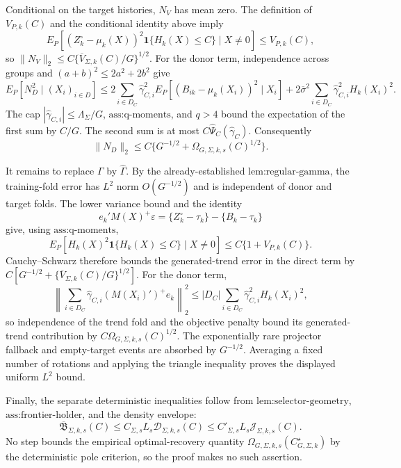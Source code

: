 Conditional on the target histories, \(N_V\) has mean zero. The definition of \(V_{P,k}(C)\) and the conditional identity above imply
\[
E_P[(Z_{k}^{\circ}-\mu_k(X))^2\mathbf 1\{H_k(X)\le C\}\mid X\ne0]
\le V_{P,k}(C),
\]
so \(\|N_V\|_2\le C\{\overline V_{\Sigma,k}(C)/G\}^{1/2}\). For the donor term, independence across groups and \((a+b)^2\le2a^2+2b^2\) give
\[
E_P[N_D^2\mid (X_i)_{i\in D}]
\le 2\sum_{i\in D_C}\widehat\gamma_{C,i}^2E_P[(B_{ik}-\mu_k(X_i))^2\mid X_i]
+2\overline\sigma^2\sum_{i\in D_C}\widehat\gamma_{C,i}^2H_k(X_i)^2.
\]
The cap \(|\widehat\gamma_{C,i}|\le\Lambda_\Sigma/G\), \(\text{ass:q-moments}\), and \(q>4\) bound the expectation of the first sum by \(C/G\). The second sum is at most \(C\widehat\Psi_C(\widehat\gamma_C)\). Consequently
\[
\|N_D\|_2\le C\{G^{-1/2}+\Omega_{G,\Sigma,k,s}(C)^{1/2}\}.
\]

It remains to replace \(\Gamma\) by \(\widehat\Gamma\). By the already-established \(\text{lem:regular-gamma}\), the training-fold error has \(L^2\) norm \(O(G^{-1/2})\) and is independent of donor and target folds. The lower variance bound and the identity
\[
e_k'M(X)^+\varepsilon
=\{Z_k^{\circ}-\tau_k\}-\{B_k-\tau_k\}
\]
give, using \(\text{ass:q-moments}\),
\[
E_P[H_k(X)^2\mathbf 1\{H_k(X)\le C\}\mid X\ne0]
\le C\{1+V_{P,k}(C)\}.
\]
Cauchy--Schwarz therefore bounds the generated-trend error in the direct term by \(C[G^{-1/2}+\{\overline V_{\Sigma,k}(C)/G\}^{1/2}]\). For the donor term,
\[
\left\|\sum_{i\in D_C}\widehat\gamma_{C,i}(M(X_i)')^+e_k\right\|_2^2
\le |D_C|\sum_{i\in D_C}\widehat\gamma_{C,i}^2H_k(X_i)^2,
\]
so independence of the trend fold and the objective penalty bound its generated-trend contribution by \(C\Omega_{G,\Sigma,k,s}(C)^{1/2}\). The exponentially rare projector fallback and empty-target events are absorbed by \(G^{-1/2}\). Averaging a fixed number of rotations and applying the triangle inequality proves the displayed uniform \(L^2\) bound.

Finally, the separate deterministic inequalities follow from \(\text{lem:selector-geometry}\), \(\text{ass:frontier-holder}\), and the density envelope:
\[
\overline{\mathfrak B}_{\Sigma,k,s}(C)
\le C_{\Sigma,s}L_s\mathcal D_{\Sigma,k,s}(C)
\le C'_{\Sigma,s}L_s\mathcal J_{\Sigma,k,s}(C).
\]
No step bounds the empirical optimal-recovery quantity \(\Omega_{G,\Sigma,k,s}(C_{G,\Sigma,k}^{\star})\) by the deterministic pole criterion, so the proof makes no such assertion.
